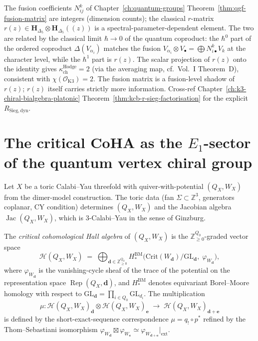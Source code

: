 \begin{remark}
\label{rem:e1-rz-fusion}
The fusion coefficients $N_{ij}^k$ of
Chapter~\ref{ch:quantum-groups}
Theorem~\ref{thm:qgf-fusion-matrix} are integers
(dimension counts); the classical $r$-matrix
$r(z) \in \mathbf H_{\Delta_5}\otimes\mathbf H_{\Delta_5}((z))$ is a
spectral-parameter-dependent element. The two are related by the
classical limit $\hbar\to 0$ of the quantum coproduct: the
$\hbar^0$ part of the ordered coproduct $\Delta(V_{\alpha_i})$
matches the fusion $V_{\alpha_i}\otimes V_\bullet = \bigoplus N_{i\bullet}^k V_k$
at the character level, while the $\hbar^1$ part is $r(z)$. The
scalar projection of $r(z)$ onto the identity gives $\kappa_{\mathrm{ch}}^{\mathrm{Hodge}} = 2$
(via the averaging map, cf.\ Vol.~I Theorem~D), consistent with
$\chi(\mathcal O_{\mathrm{K3}}) = 2$. The fusion matrix is a fusion-level
shadow of $r(z)$; $r(z)$ itself carries strictly more information.
Cross-ref Chapter~\ref{ch:k3-chiral-bialgebra-platonic}
Theorem~\ref{thm:kcb-r-sieg-factorisation} for the explicit
$R_{\mathrm{Sieg,dyn}}$.
\end{remark}

\section{The critical CoHA as the \texorpdfstring{$E_1$}{E-1}-sector of the quantum vertex
 chiral group}
\label{sec:thy-coha-e1-sector}

Let $X$ be a toric Calabi--Yau threefold with quiver-with-potential
$(Q_X, W_X)$ from the dimer-model construction. The toric data
(fan $\Sigma \subset \mathbb{Z}^3$, generators coplanar, CY condition)
determines $(Q_X, W_X)$ and the Jacobian algebra
$\operatorname{Jac}(Q_X, W_X)$, which is $3$-Calabi--Yau in the sense
of Ginzburg.

\providecommand{\BM}{\operatorname{BM}}
\begin{definition}
\label{def:thy-coha-critical}
The \emph{critical cohomological Hall algebra} of $(Q_X, W_X)$ is the
$\mathbb{Z}_{\geq 0}^{Q_0}$-graded vector space
\[
 \mathcal{H}(Q_X, W_X)
 \;=\;
 \bigoplus_{\mathbf{d}\in\mathbb{Z}_{\geq 0}^{Q_0}}
 H^{\BM}_{*}\!\bigl(
 \mathrm{Crit}(W_{\mathbf{d}})/\mathrm{GL}_{\mathbf{d}},\;
 \varphi_{W_{\mathbf{d}}}
 \bigr),
\]
where $\varphi_{W_{\mathbf{d}}}$ is the vanishing-cycle sheaf of the
trace of the potential on the representation space
$\operatorname{Rep}(Q_X, \mathbf{d})$, and $H^{\BM}_*$ denotes
equivariant Borel--Moore homology with respect to
$\mathrm{GL}_{\mathbf{d}} = \prod_{i\in Q_0}\mathrm{GL}_{d_i}$.
The multiplication
\[
 \mu \colon
 \mathcal{H}(Q_X,W_X)_{\mathbf{d}}
 \otimes
 \mathcal{H}(Q_X,W_X)_{\mathbf{e}}
 \;\longrightarrow\;
 \mathcal{H}(Q_X,W_X)_{\mathbf{d}+\mathbf{e}}
\]
is defined by the short-exact-sequence correspondence
$\mu = q_! \circ p^*$ refined by the Thom--Sebastiani isomorphism
$\varphi_{W_{\mathbf{d}}} \boxtimes \varphi_{W_{\mathbf{e}}}
\simeq \varphi_{W_{\mathbf{d}+\mathbf{e}}}|_{\mathrm{ext}}$.
\end{definition}

